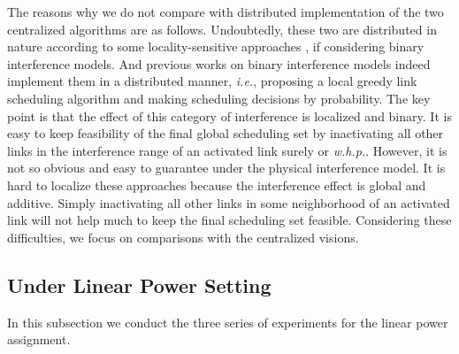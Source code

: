 \documentclass[journal]{IEEEtran}
\begin{document}
The reasons why we do not compare with distributed implementation of the two centralized algorithms are as follows.
Undoubtedly, these two are  distributed in nature according to some locality-sensitive approaches \cite{peleg87}, if  considering binary interference models. And previous works on binary interference models indeed implement them in a distributed manner, \emph{i.e.}, \cite{S:LGS} proposing a local greedy link scheduling algorithm and \cite{S:constant3} making scheduling decisions by probability. The key point is that the effect of this category of interference is localized and binary. It is easy to keep feasibility of the final global scheduling set by inactivating all other links in the interference range of an activated link surely or \emph{w.h.p.}. However, it is not so obvious and easy to guarantee under the physical interference model.
It is hard to localize these approaches because the interference effect is global and additive. Simply inactivating all other links in some neighborhood of an activated link will not help much to keep the final scheduling set feasible. Considering these difficulties, we focus on comparisons with the centralized visions.


\subsection{Under Linear Power Setting}
In this subsection we conduct the three series of experiments  for the linear power assignment.
\end{document}
